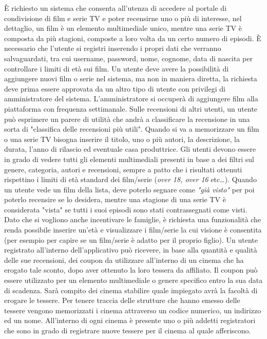 \documentclass[a4paper,12pt]{report}
\begin{document}
È richiesto un sistema che consenta all'utenza di accedere al portale di condivisione di film e serie TV e poter recensirne uno o più di interesse, nel dettaglio, un film è un elemento multimediale unico, mentre una serie TV è composta da più stagioni, composte a loro volta da un certo numero di episodi. È necessario che l'utente si registri inserendo i propri dati che verranno salvaguardati, tra cui username, password, nome, cognome, data di nascita per controllare i limiti di età sui film. Un utente deve avere la possibilità di aggiungere nuovi film o serie nel sistema, ma non in maniera diretta, la richiesta deve prima essere approvata da un altro tipo di utente con privilegi di amministratore del sistema. L'amministratore si occuperà di aggiungere film alla piattaforma con frequenza settimanale. Sulle recensioni di altri utenti, un utente può esprimere un parere di utilità che andrà a classificare la recensione in una sorta di "classifica delle recensioni più utili". Quando si va a memorizzare un film o una serie TV bisogna inserire il titolo, uno o più autori, la descrizione, la durata, l'anno di rilascio ed eventuale casa produttrice. Gli utenti devono essere in grado di vedere tutti gli elementi multimediali presenti in base a dei filtri sul genere, categoria, autori e recensioni, sempre a patto che i risultati ottenuti rispettino i limiti di età standard dei film/serie (\textit{over 18, over 16} etc\dots). Quando un utente vede un film della lista, deve poterlo segnare come \textit{"già visto"} per poi poterlo recensire se lo desidera, mentre una stagione di una serie TV è considerata "vista" se tutti i suoi episodi sono stati contrassegnati come visti. Dato che si vogliono anche incentivare le famiglie, è richiesta una funzionalità che renda possibile inserire un'età e visualizzare i film/serie la cui visione è consentita (per esempio per capire se un film/serie è adatto per il proprio figlio). Un utente registrato all'interno dell'applicativo può ricevere, in base alla quantità e qualità delle sue recensioni, dei coupon da utilizzare all'interno di un cinema che ha erogato tale sconto, dopo aver ottenuto la loro tessera da affiliato. Il coupon può essere utilizzato per un elemento multimediale o genere specifico entro la sua data di scadenza. Sarà compito dei cinema stabilire quale impiegato avrà la facoltà di erogare le tessere. Per tenere traccia delle strutture che hanno emesso delle tessere vengono memorizzati i cinema attraverso un codice numerico, un indirizzo ed un nome. All'interno di ogni cinema è presente uno o più addetti registratori che sono in grado di registrare nuove tessere per il cinema al quale afferiscono.
\end{document}
